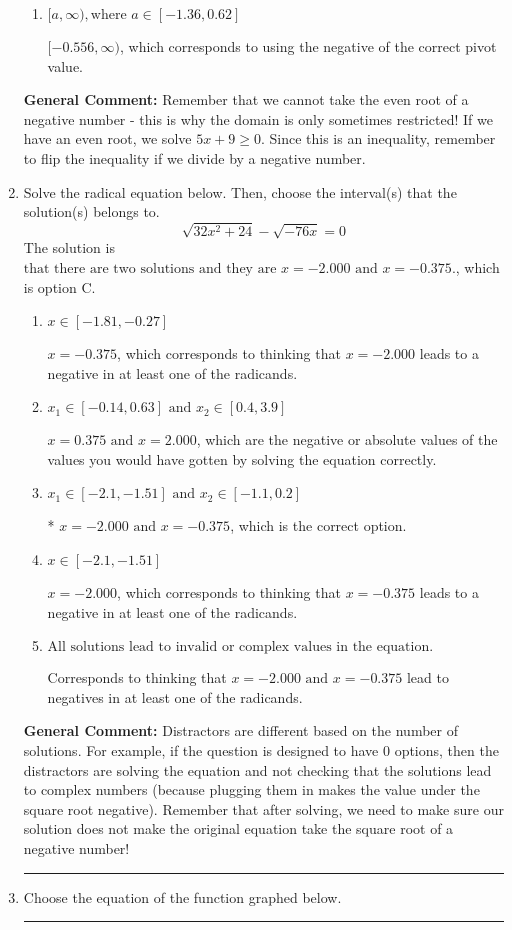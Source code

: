 \documentclass{extbook}[14pt]
\newcommand{\litem}[1]{\item #1

\rule{\textwidth}{0.4pt}}
\begin{document}
\begin{enumerate}
{\begin{enumerate}[label=\Alph*.]
* $[-1.800, \infty)$, which is the correct option.
\item \( [a, \infty), \text{where } a \in [-1.36, 0.62] \)

$[-0.556, \infty)$, which corresponds to using the negative of the correct pivot value.
\end{enumerate}

\textbf{General Comment:} Remember that we cannot take the even root of a negative number - this is why the domain is only sometimes restricted! If we have an even root, we solve $5 x + 9 \geq 0$. Since this is an inequality, remember to flip the inequality if we divide by a negative number.
}
\litem{
Solve the radical equation below. Then, choose the interval(s) that the solution(s) belongs to.
\[ \sqrt{32 x^2 + 24} - \sqrt{-76 x} = 0 \]The solution is \( \text{that there are two solutions and they are } x = -2.000 \text{ and } x = -0.375. \), which is option C.\begin{enumerate}[label=\Alph*.]
\item \( x \in [-1.81,-0.27] \)

$x = -0.375$, which corresponds to thinking that $x = -2.000$ leads to a negative in at least one of the radicands.
\item \( x_1 \in [-0.14, 0.63] \text{ and } x_2 \in [0.4,3.9] \)

$x = 0.375 \text{ and } x = 2.000$, which are the negative or absolute values of the values you would have gotten by solving the equation correctly.
\item \( x_1 \in [-2.1, -1.51] \text{ and } x_2 \in [-1.1,0.2] \)

* $x = -2.000 \text{ and } x = -0.375$, which is the correct option.
\item \( x \in [-2.1,-1.51] \)

$x = -2.000$, which corresponds to thinking that $x = -0.375$ leads to a negative in at least one of the radicands.
\item \( \text{All solutions lead to invalid or complex values in the equation.} \)

Corresponds to thinking that $x = -2.000 \text{ and } x = -0.375$ lead to negatives in at least one of the radicands.
\end{enumerate}

\textbf{General Comment:} Distractors are different based on the number of solutions. For example, if the question is designed to have 0 options, then the distractors are solving the equation and not checking that the solutions lead to complex numbers (because plugging them in makes the value under the square root negative). Remember that after solving, we need to make sure our solution does not make the original equation take the square root of a negative number!
}
\litem{
Choose the equation of the function graphed below.

}
\end{enumerate}
\end{document}
